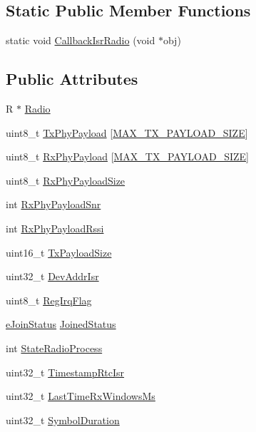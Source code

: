\subsection*{Static Public Member Functions}
\begin{DoxyCompactItemize}
\item 
static void \mbox{\hyperlink{class_radio_container_afd4dc2a290ab1f6d4cf7920ab457fac7}{Callback\+Isr\+Radio}} (void $\ast$obj)
\end{DoxyCompactItemize}
\subsection*{Public Attributes}
\begin{DoxyCompactItemize}
\item 
R $\ast$ \mbox{\hyperlink{class_radio_container_a30b5b1397632040096b08e56e2ec1d47}{Radio}}
\item 
uint8\+\_\+t \mbox{\hyperlink{class_radio_container_ad91ae082ac2890e7b71546c4b7efb5ba}{Tx\+Phy\+Payload}} \mbox{[}\mbox{\hyperlink{_define_8h_ade046d6a940b0e4d9f3ae9415066ee6f}{M\+A\+X\+\_\+\+T\+X\+\_\+\+P\+A\+Y\+L\+O\+A\+D\+\_\+\+S\+I\+ZE}}\mbox{]}
\item 
uint8\+\_\+t \mbox{\hyperlink{class_radio_container_a100c2c3e3d71652fca93d8ee0a5ecc9c}{Rx\+Phy\+Payload}} \mbox{[}\mbox{\hyperlink{_define_8h_ade046d6a940b0e4d9f3ae9415066ee6f}{M\+A\+X\+\_\+\+T\+X\+\_\+\+P\+A\+Y\+L\+O\+A\+D\+\_\+\+S\+I\+ZE}}\mbox{]}
\item 
uint8\+\_\+t \mbox{\hyperlink{class_radio_container_a2b84534ef69df6313c3c7cf9edcb234d}{Rx\+Phy\+Payload\+Size}}
\item 
int \mbox{\hyperlink{class_radio_container_a8814f4b3203f8f9fac24e77291f41dd3}{Rx\+Phy\+Payload\+Snr}}
\item 
int \mbox{\hyperlink{class_radio_container_a198c252436c6a365cb07d9d073d9d50d}{Rx\+Phy\+Payload\+Rssi}}
\item 
uint16\+\_\+t \mbox{\hyperlink{class_radio_container_abb44acd5f52b34e0a1ffaa3a1dec0bbd}{Tx\+Payload\+Size}}
\item 
uint32\+\_\+t \mbox{\hyperlink{class_radio_container_a3fce662f22e5d0beaf3b25df353c0bae}{Dev\+Addr\+Isr}}
\item 
uint8\+\_\+t \mbox{\hyperlink{class_radio_container_adbb1e0ef33a7fdeeb2e27b54a4808220}{Reg\+Irq\+Flag}}
\item 
\mbox{\hyperlink{_define_8h_abe3daafdb4fec314926c12003b3ad390}{e\+Join\+Status}} \mbox{\hyperlink{class_radio_container_a4c19319bc32e8f18dc42b70f852cd24e}{Joined\+Status}}
\item 
int \mbox{\hyperlink{class_radio_container_aaeabc6b1b8012038246bc14e1da1462f}{State\+Radio\+Process}}
\item 
uint32\+\_\+t \mbox{\hyperlink{class_radio_container_a82ecd21f7fb6701a66037821c6175e44}{Timestamp\+Rtc\+Isr}}
\item 
uint32\+\_\+t \mbox{\hyperlink{class_radio_container_a087adc0271190a23c893774d1a9f9dc0}{Last\+Time\+Rx\+Windows\+Ms}}
\item 
uint32\+\_\+t \mbox{\hyperlink{class_radio_container_a26d15cb55aa6f8b4f0bb977f3c4a4b38}{Symbol\+Duration}}
\end{DoxyCompactItemize}


